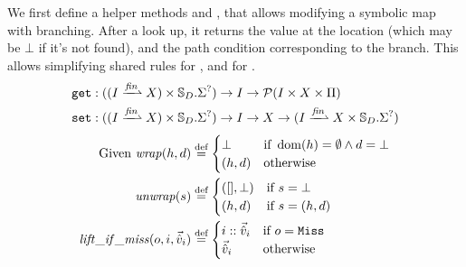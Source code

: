 We first define a helper methods  and , that allows modifying a symbolic map with branching. After a look up, it returns the value at the location (which may be $\bot$ if it's not found), and the path condition corresponding to the branch. This allows simplifying shared rules for \execac, \produce{} and \consume{} for \PMap{}.
\begin{align*}
	\code{get}&: ((I \finmap X) \times \mmdl_D.\Sigma^?) \rarr I \rarr \pset(I \times X \times \Pc) \\
	\code{set}&: ((I \finmap X) \times \mmdl_D.\Sigma^?) \rarr I \rarr X \rarr (I \finmap X \times \mmdl_D.\Sigma^?)
\end{align*}
\begin{align*}
	\text{Given }
	\mathit{wrap}(h, d) &\stackrel{\textnormal{def}}= \begin{cases}
		\bot &\text{if}~\operatorname{dom}(h)=\emptyset \land d=\bot\\
		(h,d)&\text{otherwise}
	\end{cases}\\
	\mathit{unwrap}(s) & \stackrel{\textnormal{def}}= \begin{cases}
		([], \bot) &\text{if}~s=\bot\\
		(h, d) &\text{if}~s=(h,d)
	\end{cases}\\
	\mathit{lift\_if\_miss}(o, i, \vec{\hat{v}}_i) &\stackrel{\textnormal{def}}= \begin{cases}
		i :: \vec{\hat{v}}_i &\text{if}~o=\texttt{Miss}\\
		\vec{\hat{v}}_i &\text{otherwise}
	\end{cases}
\end{align*}
